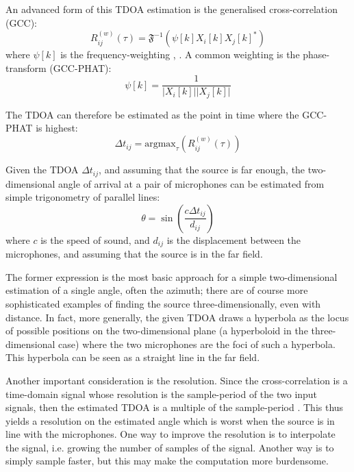 \documentclass{report}
\begin{document}
An advanced form of this TDOA estimation is the generalised cross-correlation (GCC):
\begin{equation}
R^{(w)}_{ij}(\tau) = \mathfrak{F}^{-1} \left( \psi[k]X_i[k]X_j[k]^* \right)
\end{equation}
where $\psi[k]$ is the frequency-weighting \cite{argentieri_survey_2015}, \cite{rascon_localization_2017}. A common weighting is the phase-transform (GCC-PHAT):
\begin{equation}
\psi[k] = \frac{1}{\lvert X_i[k] \rvert \lvert X_j[k] \rvert}
\end{equation}

The TDOA can therefore be estimated as the point in time where the GCC-PHAT is highest:
\begin{equation}
\Delta t_{ij} = \text{argmax}_\tau \left( R^{(w)}_{ij} (\tau) \right)
\end{equation}

Given the TDOA $\Delta t_{ij}$, and assuming that the source is far enough, the two-dimensional angle of arrival at a pair of microphones can be estimated from simple trigonometry of parallel lines:
\begin{equation}
\theta = \sin\left( \frac{c\Delta t_{ij}}{d_{ij}} \right)
\end{equation}
where $c$ is the speed of sound, and $d_{ij}$ is the displacement between the microphones, and assuming that the source is in the far field.

The former expression is the most basic approach for a simple two-dimensional estimation of a single angle, often the azimuth; there are of course more sophisticated examples of finding the source three-dimensionally, even with distance. In fact, more generally, the given TDOA draws a hyperbola as the locus of possible positions on the two-dimensional plane (a hyperboloid in the three-dimensional case) where the two microphones are the foci of such a hyperbola. This hyperbola can be seen as a straight line in the far field.

Another important consideration is the resolution. Since the cross-correlation is a time-domain signal whose resolution is the sample-period of the two input signals, then the estimated TDOA is a multiple of the sample-period \cite{argentieri_survey_2015}. This thus yields a resolution on the estimated angle which is worst when the source is in line with the microphones. One way to improve the resolution is to interpolate the signal, i.e. growing the number of samples of the signal. Another way is to simply sample faster, but this may make the computation more burdensome.
\end{document}
